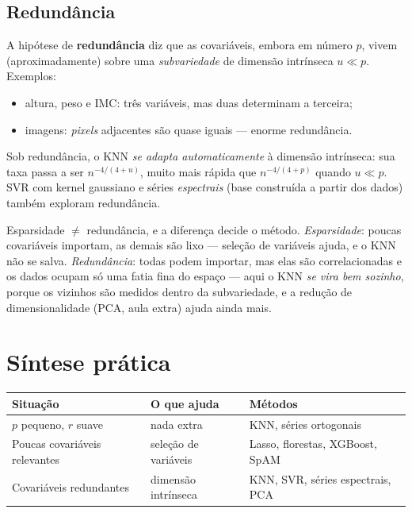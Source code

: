 \documentclass[11pt,a4paper]{article}
\begin{document}
\subsection{Redundância}
A hipótese de \textbf{redundância} diz que as covariáveis, embora em número $p$,
vivem (aproximadamente) sobre uma \emph{subvariedade} de dimensão intrínseca
$u\ll p$. Exemplos:
\begin{itemize}[leftmargin=1.4cm,nosep]
  \item altura, peso e IMC: três variáveis, mas duas determinam a terceira;
  \item imagens: \emph{pixels} adjacentes são quase iguais --- enorme redundância.
\end{itemize}
Sob redundância, o KNN \emph{se adapta automaticamente} à dimensão
intrínseca: sua taxa passa a ser $n^{-4/(4+u)}$, muito mais rápida que
$n^{-4/(4+p)}$ quando $u\ll p$. SVR com kernel gaussiano e séries \emph{espectrais}
(base construída a partir dos dados) também exploram redundância.

\begin{ideia}
Esparsidade $\neq$ redundância, e a diferença decide o método.
\emph{Esparsidade}: poucas covariáveis importam, as demais são lixo --- seleção de
variáveis ajuda, e o KNN não se salva. \emph{Redundância}: todas podem importar,
mas elas são correlacionadas e os dados ocupam só uma fatia fina do espaço --- aqui
o KNN \emph{se vira bem sozinho}, porque os vizinhos são medidos dentro da
subvariedade, e a redução de dimensionalidade (PCA, aula extra) ajuda ainda mais.
\end{ideia}

\section{Síntese prática}
\begin{center}\small
\renewcommand{\arraystretch}{1.3}
\begin{tabular}{@{}lll@{}}
\toprule
\textbf{Situação} & \textbf{O que ajuda} & \textbf{Métodos} \\
\midrule
$p$ pequeno, $r$ suave & nada extra & KNN, séries ortogonais \\
Poucas covariáveis relevantes & seleção de variáveis & Lasso, florestas, XGBoost, SpAM \\
Covariáveis redundantes & dimensão intrínseca & KNN, SVR, séries espectrais, PCA \\
\bottomrule
\end{tabular}
\end{center}
\end{document}
